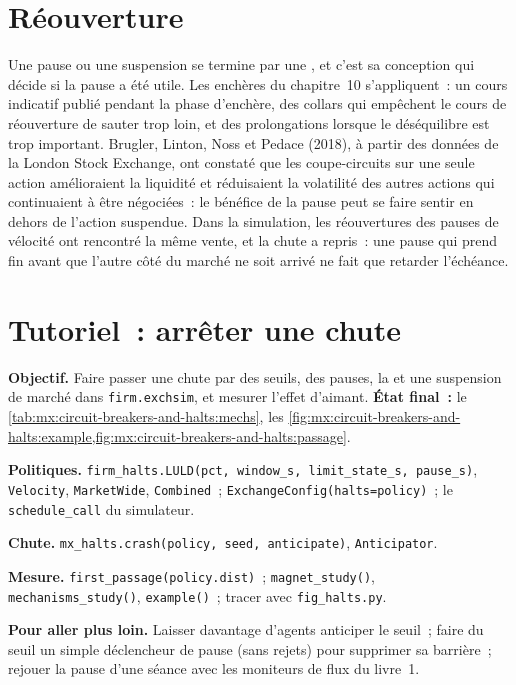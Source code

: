 \section{Réouverture}

Une pause ou une suspension se termine par une , et c'est sa conception qui décide si la pause a été utile. Les enchères du chapitre~10 s'appliquent~: un cours indicatif
publié pendant la phase d'enchère, des collars qui empêchent le cours de réouverture de sauter trop loin, et des prolongations lorsque le déséquilibre est trop important. Brugler, Linton, Noss
et Pedace (2018), à partir des données de la London Stock Exchange, ont constaté que les coupe-circuits sur une seule action amélioraient la liquidité et réduisaient la volatilité des
autres actions qui continuaient à être négociées~: le bénéfice de la pause peut se faire sentir en dehors de l'action suspendue. Dans la simulation, les réouvertures des pauses de vélocité ont rencontré la même
vente, et la chute a repris~: une pause qui prend fin avant que l'autre côté du marché ne soit arrivé ne fait que retarder l'échéance.

\section{Tutoriel~: arrêter une chute}\label{tut:mx:circuit-breakers-and-halts:tut}

\begin{tutorial}
\textbf{Objectif.} Faire passer une chute par des seuils, des pauses, la  et une suspension de marché dans \texttt{firm.exchsim}, et mesurer l'effet d'aimant.
\textbf{État final~:} le \cref{tab:mx:circuit-breakers-and-halts:mechs}, les \cref{fig:mx:circuit-breakers-and-halts:example,fig:mx:circuit-breakers-and-halts:passage}.
\begin{tutsteps}
\item \textbf{Politiques.} \texttt{firm\_halts.LULD(pct, window\_s, limit\_state\_s, pause\_s)}, \texttt{Velocity}, \texttt{MarketWide},
\texttt{Combined}~; \texttt{ExchangeConfig(halts=policy)}~; le \texttt{schedule\_call} du simulateur.
\item \textbf{Chute.} \texttt{mx\_halts.crash(policy, seed, anticipate)}, \texttt{Anticipator}.
\item \textbf{Mesure.} \texttt{first\_passage(policy.dist)}~; \texttt{magnet\_study()}, \texttt{mechanisms\_study()}, \texttt{example()}~; tracer avec
\texttt{fig\_halts.py}.
\end{tutsteps}
\textbf{Pour aller plus loin.} Laisser davantage d'agents anticiper le seuil~; faire du seuil un simple déclencheur de pause (sans rejets) pour supprimer sa barrière~; rejouer la
pause d'une séance avec les moniteurs de flux du livre~1.
\end{tutorial}

